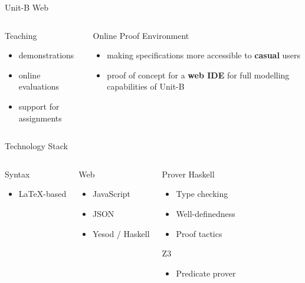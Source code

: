 \documentclass[11pt]{beamer}
\newcommand{\unitb}{Unit-B\xspace}
\begin{document}
\begin{frame}[fragile]{\unitb Web}
  \begin{columns}[T,onlytextwidth]
      \begin{block}{Teaching}
        \begin{itemize}
        \item demonstrations
        \item online evaluations
        \item support for assignments
        \end{itemize}
      \end{block}
      \pause

      \begin{block}{Online Proof Environment}
        \begin{itemize}
        \item making specifications more accessible to \textbf{casual}
          users
        \item proof of concept for a \textbf{web IDE} for full
          modelling capabilities of \unitb
        \end{itemize}
      \end{block}
  \end{columns}
\end{frame}


\begin{frame}[fragile]{Technology Stack}
  \begin{columns}[T,onlytextwidth]
      \begin{block}{Syntax}
        \begin{itemize}
        \item \textrm{\LaTeX}-based
        \end{itemize}
      \end{block}
      \pause
      \begin{block}{Web}
        \begin{itemize}
        \item JavaScript
        \item JSON
        \item Yesod / Haskell
        \end{itemize}
      \end{block}
      \pause

      \begin{block}{Prover}
        Haskell
        \begin{itemize}
        \item Type checking
        \item Well-definedness
        \item Proof tactics
        \end{itemize}
        Z3
        \begin{itemize}
        \item Predicate prover
        \end{itemize}
      \end{block}
  \end{columns}
\end{frame}
\end{document}
